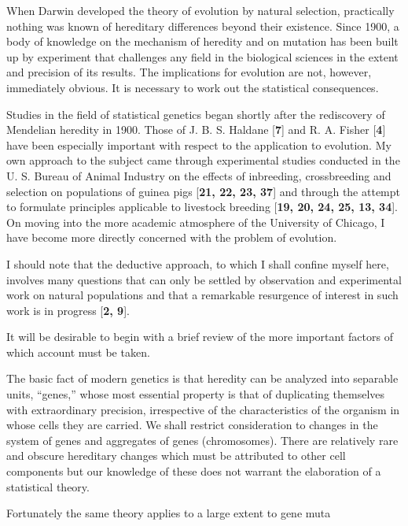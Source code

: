 \documentclass[11pt]{article}
\begin{document}
\setcounter{page}{223}
 When Darwin developed the theory of evolution by natural selection, practically nothing was known of hereditary differences beyond their existence. Since 1900, a body of knowledge on the mechanism of heredity and on mutation has been built up by experiment that challenges any field in the biological sciences in the extent and precision of its results. The implications for evolution are not, however, immediately obvious. It is necessary to work out the statistical consequences.

Studies in the field of statistical genetics began shortly after the rediscovery of Mendelian heredity in 1900. Those of J. B. S. Haldane [\textbf{7}] and R. A. Fisher [\textbf{4}] have been especially important with respect to the application to evolution. My own approach to the subject came through experimental studies conducted in the U. S. Bureau of Animal Industry on the effects of inbreeding, crossbreeding and selection on populations of guinea pigs [\textbf{21, 22, 23, 37}] and through the attempt to formulate principles applicable to livestock breeding [\textbf{19, 20, 24, 25, 13, 34}]. On moving into the more academic atmosphere of the University of Chicago, I have become more directly concerned with the problem of evolution.

I should note that the deductive approach, to which I shall confine myself here, involves many questions that can only be settled by observation and experimental work on natural populations and that a remarkable resurgence of interest in such work is in progress [\textbf{2, 9}].

\medskip
{} It will be desirable to begin with a brief review of the more important factors of which account must be taken.

The basic fact of modern genetics is that heredity can be analyzed into separable units, ``genes,'' whose most essential property is that of duplicating themselves with extraordinary precision, irrespective of the characteristics of the organism in whose cells they are carried. We shall restrict consideration to changes in the system of genes and aggregates of genes (chromosomes). There are relatively rare and obscure hereditary changes which must be attributed to other cell components but our knowledge of these does not warrant the elaboration of a statistical theory.

Fortunately the same theory applies to a large extent to gene muta
\end{document}
